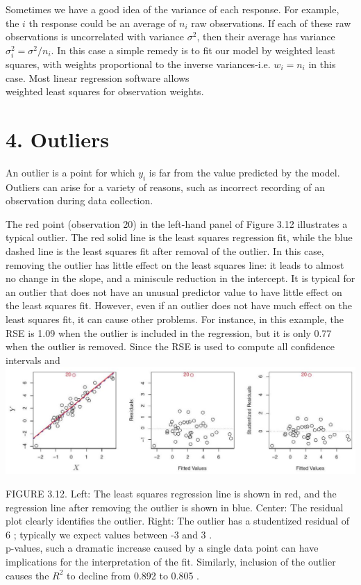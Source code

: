 \documentclass[10pt]{article}
\begin{document}
Sometimes we have a good idea of the variance of each response. For example, the $i$ th response could be an average of $n_{i}$ raw observations. If each of these raw observations is uncorrelated with variance $\sigma^{2}$, then their average has variance $\sigma_{i}^{2}=\sigma^{2} / n_{i}$. In this case a simple remedy is to fit our model by weighted least squares, with weights proportional to the inverse variances-i.e. $w_{i}=n_{i}$ in this case. Most linear regression software allows\\
weighted least squares for observation weights.

\section*{4. Outliers}
An outlier is a point for which $y_{i}$ is far from the value predicted by the model. Outliers can arise for a variety of reasons, such as incorrect recording of an observation during data collection.

The red point (observation 20) in the left-hand panel of Figure 3.12 illustrates a typical outlier. The red solid line is the least squares regression fit, while the blue dashed line is the least squares fit after removal of the outlier. In this case, removing the outlier has little effect on the least squares line: it leads to almost no change in the slope, and a miniscule reduction in the intercept. It is typical for an outlier that does not have an unusual predictor value to have little effect on the least squares fit. However, even if an outlier does not have much effect on the least squares fit, it can cause other problems. For instance, in this example, the RSE is 1.09 when the outlier is included in the regression, but it is only 0.77 when the outlier is removed. Since the RSE is used to compute all confidence intervals and\\
\includegraphics[max width=\textwidth, center]{2025_05_05_efe77898333945044de4g-112}

FIGURE 3.12. Left: The least squares regression line is shown in red, and the regression line after removing the outlier is shown in blue. Center: The residual plot clearly identifies the outlier. Right: The outlier has a studentized residual of 6 ; typically we expect values between -3 and 3 .\\
p-values, such a dramatic increase caused by a single data point can have implications for the interpretation of the fit. Similarly, inclusion of the outlier causes the $R^{2}$ to decline from 0.892 to 0.805 .
\end{document}
